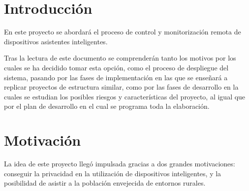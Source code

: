 \section{Introducción}

En este proyecto se abordará el proceso de control y monitorización remota de dispositivos asistentes inteligentes.

Tras la lectura de este documento se comprenderán tanto los motivos por los cuales se ha decidido tomar esta opción, como el proceso de despliegue del sistema, pasando por las fases de implementación en las que se enseñará a replicar proyectos de estructura similar, como por las fases de desarrollo en la cuales se estudian los posibles riesgos y características del proyecto, al igual que por el plan de desarrollo en el cual se programa toda la elaboración.

\section{Motivación}

La idea de este proyecto llegó impulsada gracias a dos grandes motivaciones: conseguir la privacidad en la utilización de dispositivos inteligentes, y la posibilidad de asistir a la población envejecida de entornos rurales.

